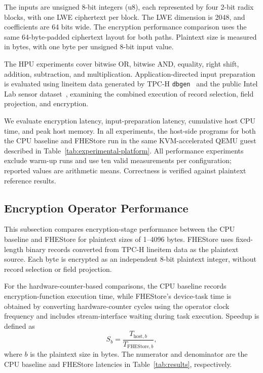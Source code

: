 \documentclass[sigconf,anonymous,balance=false]{acmart}
\newcommand{\bodypar}{\par\vskip 0pt plus 6pt\relax}
\begin{document}
The inputs are unsigned 8-bit integers (u8), each represented by four 2-bit radix blocks, with one LWE ciphertext per block. The LWE dimension is 2048, and coefficients are 64 bits wide. The encryption performance comparison uses the same 64-byte-padded ciphertext layout for both paths. Plaintext size is measured in bytes, with one byte per unsigned 8-bit input value.
\bodypar

The HPU experiments cover bitwise OR, bitwise AND, equality, right shift, addition, subtraction, and multiplication. Application-directed input preparation is evaluated using lineitem data generated by TPC-H \texttt{dbgen}~\cite{tpch2022spec} and the public Intel Lab sensor dataset~\cite{bodik2004intellab}, examining the combined execution of record selection, field projection, and encryption.
\bodypar

We evaluate encryption latency, input-preparation latency, cumulative host CPU time, and peak host memory. In all experiments, the host-side programs for both the CPU baseline and FHEStore run in the same KVM-accelerated QEMU guest described in Table~\ref{tab:experimental-platform}. All performance experiments exclude warm-up runs and use ten valid measurements per configuration; reported values are arithmetic means. Correctness is verified against plaintext reference results.
\bodypar

\subsection{Encryption Operator Performance}
This subsection compares encryption-stage performance between the CPU baseline and FHEStore for plaintext sizes of 1--4096 bytes. FHEStore uses fixed-length binary records converted from TPC-H lineitem data as the plaintext source. Each byte is encrypted as an independent 8-bit plaintext integer, without record selection or field projection.
\bodypar

For the hardware-counter-based comparisons, the CPU baseline records encryption-function execution time, while FHEStore's device-task time is obtained by converting hardware-counter cycles using the operator clock frequency and includes stream-interface waiting during task execution. Speedup is defined as
\begin{equation}
  S_b = \frac{T_{\mathrm{host},b}}{T_{\mathrm{FHEStore},b}},
  \label{eq:speedup}
\end{equation}
where $b$ is the plaintext size in bytes. The numerator and denominator are the CPU baseline and FHEStore latencies in Table~\ref{tab:results}, respectively.
\bodypar
\end{document}
